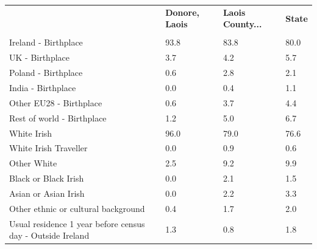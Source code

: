 \documentclass{article}
\begin{document}
\pagebreak
\begin{table}[h]	
\centering
		\begin{tabular}{KTTT}
  \hline
& \textbf{Donore, Laois} & \textbf{Laois County...} & \textbf{State}\\ 
  \hline
    \\ 
    \hline
Ireland - Birthplace & 93.8& 83.8& 80.0\\
UK - Birthplace & 3.7& 4.2& 5.7\\
Poland - Birthplace & 0.6& 2.8& 2.1\\
India - Birthplace & 0.0& 0.4& 1.1\\
Other EU28 - Birthplace & 0.6& 3.7& 4.4\\
Rest of world - Birthplace & 1.2& 5.0& 6.7\\
    \hline
White Irish & 96.0& 79.0& 76.6\\
White Irish Traveller & 0.0& 0.9& 0.6\\
Other White & 2.5& 9.2& 9.9\\
Black or Black Irish & 0.0& 2.1& 1.5\\
Asian or Asian Irish & 0.0& 2.2& 3.3\\
Other ethnic or cultural background & 0.4& 1.7& 2.0\\
    \hline
Usual residence 1 year before census day - Outside Ireland & 1.3& 0.8& 1.8\\


\end{tabular}
\end{table}
\end{document}
